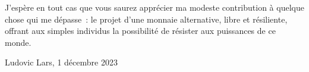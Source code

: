 J'espère en tout cas que vous saurez apprécier ma modeste contribution à quelque chose qui me dépasse~: le projet d'une monnaie alternative, libre et résiliente, offrant aux simples individus la possibilité de résister aux puissances de ce monde.

\begin{flushright}Ludovic Lars, 1\ier{} décembre 2023\end{flushright}

%
%
%
%
